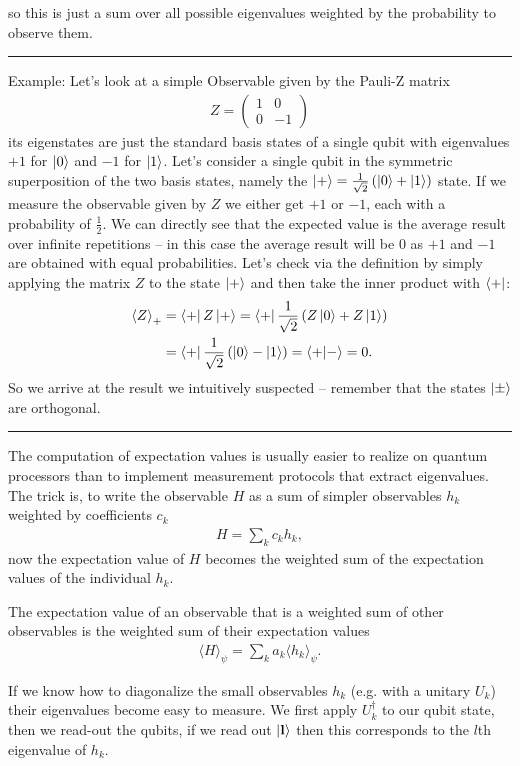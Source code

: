 so this is just a sum over all possible eigenvalues weighted by the probability to observe them.
\vspace{0.5cm}
\noindent\rule{\textwidth}{0.4pt}
\vspace{0.5cm}
Example: Let's look at a simple Observable given by the Pauli-Z matrix
\begin{align}
Z = \begin{pmatrix}
    1 & 0\\ 0 & -1
\end{pmatrix}
\end{align}
its eigenstates are just the standard basis states of a single qubit with eigenvalues $+1$ for $\ket{0}$ and $-1$ for $\ket{1}$. Let's consider a single qubit in the symmetric superposition of the two basis states, namely the $\ket{+} = \frac{1}{\sqrt{2}}\left(\ket{0}+\ket{1}\right)$ state. If we measure the observable given by $Z$ we either get $+1$ or $-1$, each with a probability of $\frac{1}{2}$. We can directly see that the expected value is the average result over infinite repetitions -- in this case the average result will be 0 as $+1$ and $-1$ are obtained with equal probabilities. Let's check via the definition by simply applying the matrix $Z$ to the state $\ket{+}$ and then take the inner product with $\bra{+}$:
\begin{align}
    \expval{Z}_{+} &= \bra{+}Z\ket{+} = \bra{+}\frac{1}{\sqrt{2}}\left(Z\ket{0} + Z\ket{1} \right) \\
    &= \bra{+} \frac{1}{\sqrt{2}}\left( \ket{0} - \ket{1}\right) = \braket{+}{-} = 0.
\end{align}
So we arrive at the result we intuitively suspected -- remember that the states $\ket{\pm}$ are orthogonal.
\vspace{0.5cm}
\noindent\rule{\textwidth}{0.4pt}
\vspace{0.5cm}
The computation of expectation values is usually easier to realize on quantum processors than to implement measurement protocols that extract eigenvalues. The trick is, to write the observable $H$ as a sum of simpler observables $h_k$ weighted by coefficients $c_k$
\begin{align}
    H = \sum_{k} c_k h_k,
\end{align}
now the expectation value of $H$ becomes the weighted sum of the expectation values of the individual $h_k$.
\begin{theorem*}
The expectation value of an observable that is a weighted sum of other observables is the weighted sum of their expectation values
\begin{align}
    \langle H \rangle_\psi = \sum_k a_k \langle h_k \rangle_\psi.
\end{align}
\end{theorem*}
If we know how to diagonalize the small observables $h_k$ (e.g. with a unitary $U_k$) their eigenvalues become easy to measure. 
We first apply $U_k^\dagger$ to our qubit state, then we read-out the qubits, if we read out $\ket{\mathbf{l}}$ then this corresponds to the $l$th eigenvalue of $h_k$.

